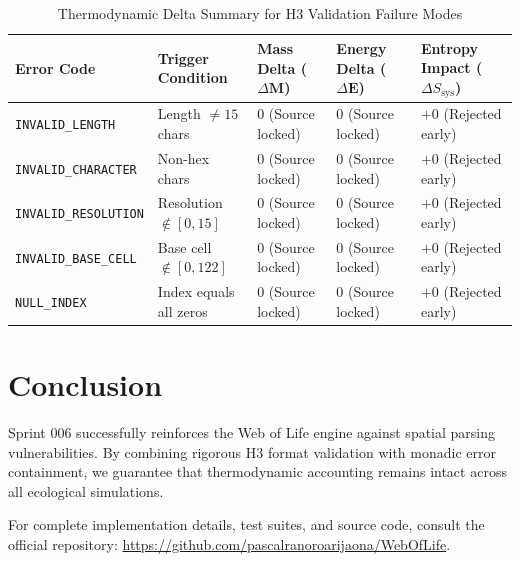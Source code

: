 \documentclass[11pt, a4paper]{article}
\begin{document}
\begin{table}[h]
\centering
\caption{Thermodynamic Delta Summary for H3 Validation Failure Modes}
\begin{tabular}{lllll}
\toprule
\textbf{Error Code} & \textbf{Trigger Condition} & \textbf{Mass Delta ($\Delta \mathbf{M}$)} & \textbf{Energy Delta ($\Delta \mathbf{E}$)} & \textbf{Entropy Impact ($\Delta S_{\text{sys}}$)} \\
\midrule
\texttt{INVALID\_LENGTH} & Length $\neq 15$ chars & 0 (Source locked) & 0 (Source locked) & $+0$ (Rejected early) \\
\texttt{INVALID\_CHARACTER} & Non-hex chars & 0 (Source locked) & 0 (Source locked) & $+0$ (Rejected early) \\
\texttt{INVALID\_RESOLUTION} & Resolution $\notin [0,15]$ & 0 (Source locked) & 0 (Source locked) & $+0$ (Rejected early) \\
\texttt{INVALID\_BASE\_CELL} & Base cell $\notin [0,122]$ & 0 (Source locked) & 0 (Source locked) & $+0$ (Rejected early) \\
\texttt{NULL\_INDEX} & Index equals all zeros & 0 (Source locked) & 0 (Source locked) & $+0$ (Rejected early) \\
\bottomrule
\end{tabular}
\end{table}

\section{Conclusion}
Sprint 006 successfully reinforces the Web of Life engine against spatial parsing vulnerabilities. By combining rigorous H3 format validation with monadic error containment, we guarantee that thermodynamic accounting remains intact across all ecological simulations. 

For complete implementation details, test suites, and source code, consult the official repository: \url{https://github.com/pascalranoroarijaona/WebOfLife}.
\end{document}

